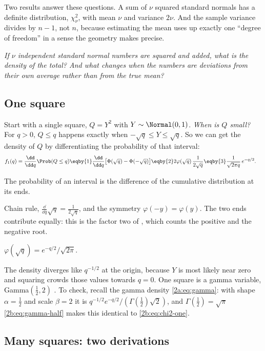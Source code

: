 Two results answer these questions. A sum of $\nu$ squared standard normals has a definite distribution, $\chi^2_\nu$, with mean $\nu$ and variance $2\nu$. And the sample variance divides by $n-1$, not $n$, because estimating the mean uses up exactly one ``degree of freedom'' in a sense the geometry makes precise.

\emph{If $\nu$ independent standard normal numbers are squared and added, what is the density of the total? And what changes when the numbers are deviations from their own average rather than from the true mean?}

\subsection{One square}
\label{2b:sec:chi2-one}

Start with a single square, $Q=Y^2$ with $Y\sim\Normal(0,1)$. \emph{When is $Q$ small?} For $q>0$, $Q\le q$ happens exactly when $-\sqrt q\le Y\le\sqrt q$. So we can get the density of $Q$ by differentiating the probability of that interval:
\begin{align}
  f_1(q)=\frac{\dd}{\dd q}\Prob(Q\le q)
  &\eqby{1} \frac{\dd}{\dd q}\bigl[\Phi(\sqrt q)-\Phi(-\sqrt q)\bigr]
   \eqby{2} 2\varphi(\sqrt q)\,\frac{1}{2\sqrt q}
   \eqby{3} \frac{1}{\sqrt{2\pi q}}\,e^{-q/2} .
  \label{2b:eq:chi2-one}
\end{align}
\begin{explain}
  \item The probability of an interval is the difference of the cumulative distribution at its ends.
  \item Chain rule, $\frac{\dd}{\dd q}\sqrt q=\frac1{2\sqrt q}$, and the symmetry $\varphi(-y)=\varphi(y)$. The two ends contribute equally: this is the factor two of , which counts the positive and the negative root.
  \item $\varphi(\sqrt q)=e^{-q/2}/\sqrt{2\pi}$.
\end{explain}
The density diverges like $q^{-1/2}$ at the origin, because $Y$ is most likely near zero and squaring crowds those values towards $q=0$. One square is a gamma variable, Gamma$(\frac12,2)$ . To check, recall the gamma density \eqref{2a:eq:gamma}: with shape $\alpha=\frac12$ and scale $\beta=2$ it is $q^{-1/2}e^{-q/2}/(\Gamma(\frac12)\sqrt2)$, and $\Gamma(\frac12)=\sqrt\pi$ \eqref{2b:eq:gamma-half} makes this identical to \eqref{2b:eq:chi2-one}.

\subsection{Many squares: two derivations}
\label{2b:sec:chi2-many}

